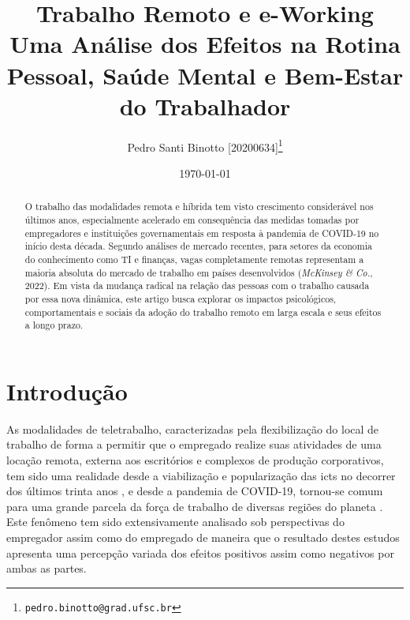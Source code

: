 \documentclass[12pt]{article}
\title{%
   Trabalho Remoto e e-Working\\
   \large Uma Análise dos Efeitos na Rotina Pessoal, Saúde Mental e Bem-Estar do Trabalhador }
\author[1]{Pedro Santi Binotto [20200634]\thanks{\texttt{pedro.binotto@grad.ufsc.br}}}
\date{\today}
\affil[1]{Departamento de Informática e Estatística, Universidade Federal de Santa Catarina}
\begin{document}
\begin{titlepage}
\maketitle
\thispagestyle{empty}

\begin{abstract} \noindent
  O trabalho das modalidades remota e híbrida tem visto crescimento considerável nos últimos anos, 
  especialmente acelerado em consequência das medidas tomadas por empregadores e instituições governamentais em resposta
  à pandemia de COVID-19 no início desta década. Segundo análises de mercado recentes, para setores da economia do
  conhecimento como TI e finanças, vagas completamente remotas representam a maioria absoluta
  do mercado de trabalho em países desenvolvidos (\textit{McKinsey \& Co.}, 2022). Em vista da mudança radical na %
  relação das pessoas com o trabalho causada por essa nova dinâmica, este artigo busca explorar os impactos psicológicos,
  comportamentais e sociais da adoção do trabalho remoto em larga escala e seus efeitos a longo prazo.
\end{abstract}

\end{titlepage}

\newpage
\tableofcontents

\newpage
\printglossary[title=Glossário, toctitle=Glossário]

\newpage
\section{Introdução}

As modalidades de teletrabalho, caracterizadas pela flexibilização do local de trabalho \cite{ilo2020} de forma a
permitir que o empregado realize suas atividades de uma locação remota, externa aos escritórios e complexos de produção
corporativos, tem sido uma realidade desde a viabilização e popularização das \gls{ict}s  \cite{diMartino1990} no
decorrer dos últimos trinta anos \cite{jit2012}, e desde a pandemia de COVID-19, tornou-se comum para uma grande parcela
da força de trabalho de diversas regiões do planeta \cite{apolloTechnical2024}. Este fenômeno tem sido
extensivamente analisado sob perspectivas do empregador \cite{hofschulteBeck2022,sustainability2022} assim como do
empregado \cite{ijerph2021,ntwe2017} de maneira que o resultado destes estudos apresenta uma percepção variada dos
efeitos positivos assim como negativos por ambas as partes.
\end{document}
